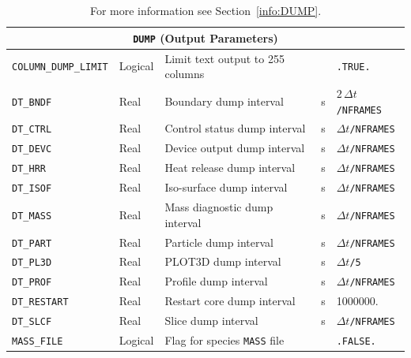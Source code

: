 \documentclass[11pt]{book}
\newcommand{\ct}{\tt\small}
\begin{document}
\begin{table}[H]
\caption{For more information see Section~\ref{info:DUMP}.}\label{tbl:DUMP}
\noindent
\begin{tabular*}{6.5in}{@{\extracolsep{\fill}}|l|l|l|l|l|}
\hline
\multicolumn{5}{|c|}{{\ct DUMP} (Output Parameters)} \\ \hline \hline
{\ct COLUMN\_DUMP\_LIMIT}       & Logical      & Limit text output to 255 columns  &           & {\ct .TRUE.}                      \\ \hline
{\ct DT\_BNDF}                  & Real         & Boundary dump interval            &  s        & $2\,\Delta t${\ct /NFRAMES} \\ \hline
{\ct DT\_CTRL}                  & Real         & Control status dump interval      &  s        & $\Delta t${\ct /NFRAMES}   \\ \hline
{\ct DT\_DEVC}                  & Real         & Device output dump interval       &  s        & $\Delta t${\ct /NFRAMES}   \\ \hline
{\ct DT\_HRR}                   & Real         & Heat release dump interval        &  s        & $\Delta t${\ct /NFRAMES}   \\ \hline
{\ct DT\_ISOF}                  & Real         & Iso-surface dump interval         &  s        & $\Delta t${\ct /NFRAMES}   \\ \hline
{\ct DT\_MASS}                  & Real         & Mass diagnostic dump interval     &  s        & $\Delta t${\ct /NFRAMES}   \\ \hline
{\ct DT\_PART}                  & Real         & Particle dump interval            &  s        & $\Delta t${\ct /NFRAMES}   \\ \hline
{\ct DT\_PL3D}                  & Real         & PLOT3D dump interval              &  s        & $\Delta t${\ct /5}         \\ \hline
{\ct DT\_PROF}                  & Real         & Profile dump interval             &  s        & $\Delta t${\ct /NFRAMES}   \\ \hline
{\ct DT\_RESTART}               & Real         & Restart core dump interval        &  s        & 1000000.                          \\ \hline
{\ct DT\_SLCF}                  & Real         & Slice dump interval               &  s        & $\Delta t${\ct /NFRAMES}    \\ \hline
{\ct MASS\_FILE}                & Logical      & Flag for species {\ct MASS} file  &           & {\ct .FALSE.}                     \\ \hline

\end{tabular*}
\end{table}
\end{document}
